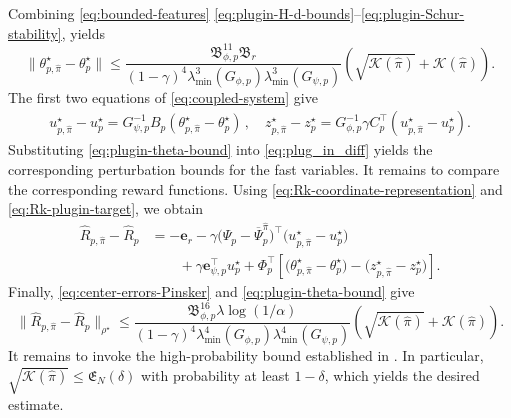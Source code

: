 \documentclass{article}
\theoremstyle{definition}
\theoremstyle{remark}
\theoremstyle{plain}
\def\eqsp{\,}
\newcommand{\dsieve}{p}
\numberwithin{equation}{section}
\begin{document}
Combining \eqref{eq:bounded-features} \eqref{eq:plugin-H-d-bounds}--\eqref{eq:plugin-Schur-stability},
 yields
\begin{equation}
\label{eq:plugin-theta-bound}
    \|
        \theta_{\dsieve,\widehat\pi}^\star
        -
        \theta_\dsieve^\star
    \|
    \leq
    \frac{\mathfrak{B}_{\phi,\dsieve}^{11}\mathfrak B_r}{(1-\gamma)^4\lambda_{\min}^3(G_{\phi,\dsieve})\lambda_{\min}^3(G_{\psi,\dsieve})}
    \left(
        \sqrt{\mathcal K(\widehat\pi)}
        +
        \mathcal K(\widehat\pi)
    \right).
\end{equation}
The first two equations of \eqref{eq:coupled-system} give
\begin{align}
\label{eq:plug_in_diff}
u_{\dsieve,\widehat\pi}^\star -  u_\dsieve^\star
    =
    G_{\psi,\dsieve}^{-1}
B_\dsieve(\theta^\star_{\dsieve, \widehat\pi}-\theta_\dsieve^\star)\eqsp,
    \quad
z_{\dsieve,\widehat\pi}^\star - z_\dsieve^\star
    =
    G_{\phi,\dsieve}^{-1}
        \gamma C_\dsieve^\top (u_{\dsieve,\widehat\pi}^\star - u_\dsieve^\star).
\end{align}
Substituting \eqref{eq:plugin-theta-bound} into \eqref{eq:plug_in_diff} yields the corresponding perturbation bounds for the fast variables. It remains to compare the corresponding reward functions. Using
\eqref{eq:Rk-coordinate-representation} and
\eqref{eq:Rk-plugin-target}, we obtain
\begin{align*}
    \widehat R_{\dsieve,\widehat\pi}
    -
    \widehat R_\dsieve
    &=
    -\mathbf{e}_r
    -
    \gamma
    \bigl(
        \Psi_\dsieve
        -
        \overline\Psi_\dsieve^{\widehat\pi}
    \bigr)^\top
    \bigl(
        u_{\dsieve,\widehat\pi}^\star
        -
        u_\dsieve^\star
    \bigr)
    \\
    &\qquad
    +
    \gamma
    \mathbf{e}_{\psi,\dsieve}^\top
    u_\dsieve^\star
    +
    \Phi_\dsieve^\top
    \left[
        \bigl(
            \theta_{\dsieve,\widehat\pi}^\star
            -
            \theta_\dsieve^\star
        \bigr)
        -
        \bigl(
            z_{\dsieve,\widehat\pi}^\star
            -
            z_\dsieve^\star
        \bigr)
    \right].
\end{align*}
Finally, \eqref{eq:center-errors-Pinsker} and 
\eqref{eq:plugin-theta-bound} give
\[
    \|
        \widehat R_{\dsieve,\widehat\pi}
        -
        \widehat R_\dsieve
    \|_{\rho^\star}
    \leq
    \frac{\mathfrak{B}_{\phi,\dsieve}^{16}\lambda\log(1/\alpha)}{(1-\gamma)^4\lambda_{\min}^4(G_{\phi,\dsieve})\lambda_{\min}^4(G_{\psi,\dsieve})}
    \left(
        \sqrt{\mathcal K(\widehat\pi)}
        +
       \mathcal K(\widehat\pi)
    \right).
\]
It remains to invoke the high-probability bound established in . In particular, \(\sqrt{\mathcal K(\widehat\pi)}\leq \mathfrak E_N(\delta)\) with probability at least \(1-\delta\), which yields the desired estimate.
\end{document}
